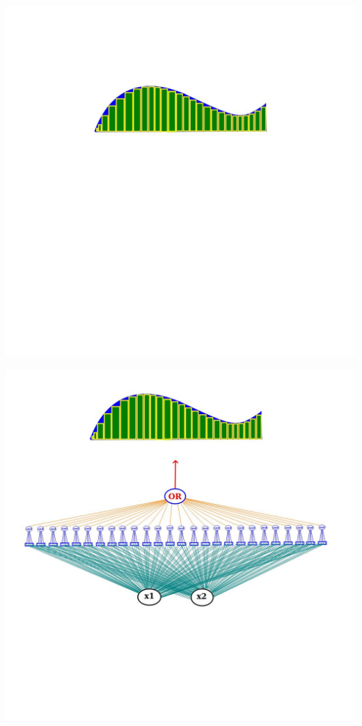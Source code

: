 \documentclass[12pt,aspectratio=169]{beamer}
\begin{document}
\begin{frame}
\begin{center}
\includegraphics[scale=0.4]{nonlinear2}
\end{center}
\end{frame}


\begin{frame}
\begin{center}
\includegraphics[scale=0.4]{nonlinear3}
\end{center}
\end{frame}
\end{document}
